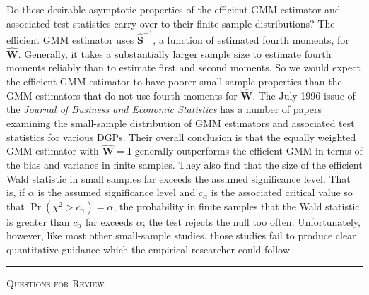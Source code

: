 Do these desirable asymptotic properties of the efficient GMM estimator and associated
test statistics carry over to their finite-sample distributions?  The efficient
GMM estimator uses $\hat{\mathbf{S}}^{-1}$, a function of estimated fourth moments, for
$\hat{\mathbf{W}}$.  Generally, it takes a substantially larger sample size to estimate fourth moments
reliably than to estimate first and second moments.  So we would expect the efficient GMM
estimator to have poorer small-sample properties than the GMM estimators that do
not use fourth moments for $\hat{\mathbf{W}}$.  The July 1996 issue of the \emph{Journal of Business
and Economic Statistics} has a number of papers examining the small-sample distribution
of GMM estimators and associated test statistics for various DGPs.  Their
overall conclusion is that the equally weighted GMM estimator with $\hat{\mathbf{W}} = \mathbf{I}$
generally outperforms the efficient GMM in terms of the bias and variance in finite
samples.  They also find that the size of the efficient Wald statistic in small samples
far exceeds the assumed significance level.  That is, if $\alpha$ is the assumed significance
level and $c_\alpha$ is the associated critical value so that
$\Pr(\chi^2 > c_\alpha) = \alpha$, the probability in finite samples that the Wald statistic is
greater than $c_\alpha$ far exceeds $\alpha$; the test rejects the null too often.  Unfortunately,
however, like most other small-sample studies, those studies fail to produce clear
quantitative guidance which the empirical researcher could follow.

\bigskip
\begin{center}\rule{0.6\textwidth}{0.4pt}\end{center}
\noindent\textsc{Questions for Review}
\medskip


